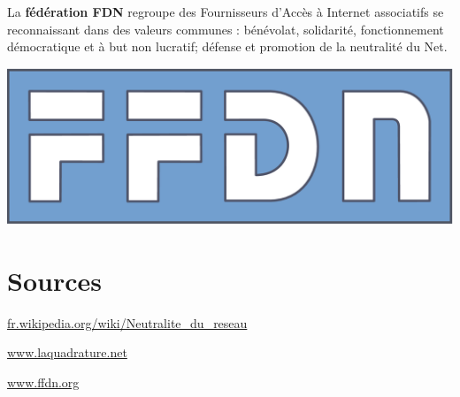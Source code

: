 \documentclass[12pt]{../fiche}
\begin{document}
\begin{minipage}{0.65\textwidth}
    La \textbf{fédération FDN} regroupe des Fournisseurs d'Accès à Internet
associatifs se reconnaissant dans des valeurs communes : bénévolat,
solidarité, fonctionnement démocratique et à but non lucratif; défense
et promotion de la neutralité du Net.
\end{minipage}
\hfill
\begin{minipage}{0.25\textwidth}
\includegraphics[width=\linewidth]{ffdn.png}
\end{minipage}

\section{Sources}\label{sources}

\url{fr.wikipedia.org/wiki/Neutralite_du_reseau}

\url{www.laquadrature.net}

\url{www.ffdn.org}
\end{document}
